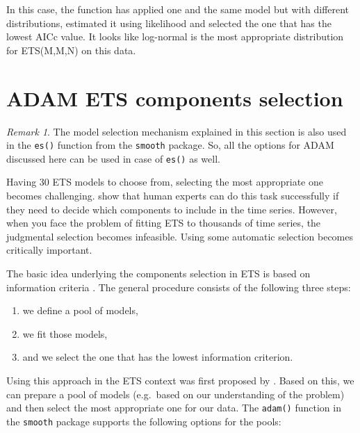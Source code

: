 \documentclass[]{book}
\providecommand{\tightlist}{%
  \setlength{\itemsep}{0pt}\setlength{\parskip}{0pt}}
\theoremstyle{definition}
\theoremstyle{definition}
\theoremstyle{definition}
\theoremstyle{definition}
\theoremstyle{remark}
\newtheorem*{remark}{Remark}
\begin{document}
In this case, the function has applied one and the same model but with different distributions, estimated it using likelihood and selected the one that has the lowest AICc value. It looks like log-normal is the most appropriate distribution for ETS(M,M,N) on this data.

\hypertarget{ETSSelection}{%
\section{ADAM ETS components selection}\label{ETSSelection}}

\begin{remark}
The model selection mechanism explained in this section is also used in the \texttt{es()} function from the \texttt{smooth} package. So, all the options for ADAM discussed here can be used in case of \texttt{es()} as well.
\end{remark}

Having 30 ETS models to choose from, selecting the most appropriate one becomes challenging. \citet{Petropoulos2018a} show that human experts can do this task successfully if they need to decide which components to include in the time series. However, when you face the problem of fitting ETS to thousands of time series, the judgmental selection becomes infeasible. Using some automatic selection becomes critically important.

The basic idea underlying the components selection in ETS is based on information criteria \citep[Section 13.3 of][]{SvetunkovSBA}. The general procedure consists of the following three steps:

\begin{enumerate}
\def\labelenumi{\arabic{enumi}.}
\tightlist
\item
  we define a pool of models,
\item
  we fit those models,
\item
  and we select the one that has the lowest information criterion.
\end{enumerate}

Using this approach in the ETS context was first proposed by \citet{Hyndman2002}. Based on this, we can prepare a pool of models (e.g.~based on our understanding of the problem) and then select the most appropriate one for our data. The \texttt{adam()} function in the \texttt{smooth} package supports the following options for the pools:
\end{document}
